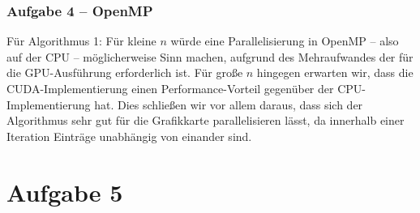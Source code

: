 \documentclass[german,notes,18pt]{beamer}
\begin{document}
	\begin{frame}
		\frametitle{Aufgabe 4 -- OpenMP}
		Für Algorithmus 1: Für kleine $n$ würde eine Parallelisierung in OpenMP -- also auf der CPU -- möglicherweise Sinn machen, aufgrund des Mehraufwandes der für die GPU-Ausführung erforderlich ist. Für große $n$ hingegen erwarten wir, dass die CUDA-Implementierung einen Performance-Vorteil gegenüber der CPU-Implementierung hat. Dies schließen wir vor allem daraus, dass sich der Algorithmus sehr gut für die Grafikkarte parallelisieren lässt, da innerhalb einer Iteration Einträge unabhängig von einander sind.
	\end{frame}


	\section{Aufgabe 5}
\end{document}
